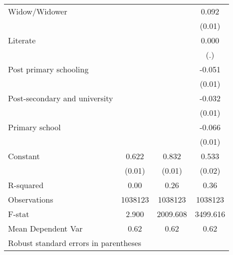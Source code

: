 {\begin{tabular}{l*{3}{c}}
Widow/Widower       &                     &                     &       0.092\sym{***}\\
                    &                     &                     &      (0.01)         \\
Literate            &                     &                     &       0.000         \\
                    &                     &                     &         (.)         \\
Post primary schooling&                     &                     &      -0.051\sym{***}\\
                    &                     &                     &      (0.01)         \\
Post-secondary and university&                     &                     &      -0.032\sym{*}  \\
                    &                     &                     &      (0.01)         \\
Primary school      &                     &                     &      -0.066\sym{***}\\
                    &                     &                     &      (0.01)         \\
Constant            &       0.622\sym{***}&       0.832\sym{***}&       0.533\sym{***}\\
                    &      (0.01)         &      (0.01)         &      (0.02)         \\
\hline
R-squared           &        0.00         &        0.26         &        0.36         \\
Observations        &     1038123         &     1038123         &     1038123         \\
F-stat              &       2.900         &    2009.608         &    3499.616         \\
Mean Dependent Var  &        0.62         &        0.62         &        0.62         \\
\hline\hline
\multicolumn{4}{l}{\footnotesize Robust standard errors in parentheses}\\
\end{tabular}
}
